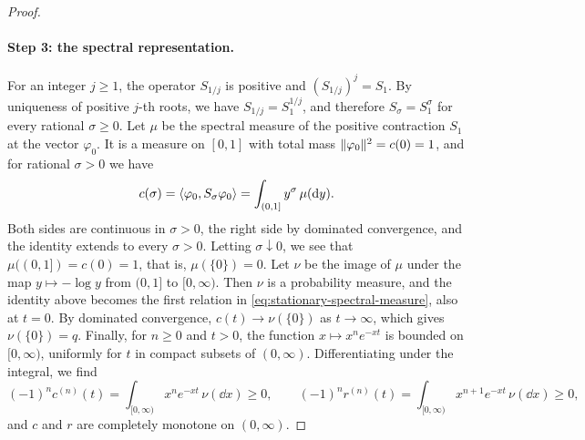 \begin{proof}
\paragraph{Step 3: the spectral representation.}
For an integer $j\ge1$, the operator $S_{1/j}$ is positive and $(S_{1/j})^j=S_1$. By uniqueness of positive $j$-th roots, we have $S_{1/j}=S_1^{1/j}$, and therefore $S_\sigma=S_1^\sigma$ for every rational $\sigma\ge0$. Let $\mu$ be the spectral measure of the positive contraction $S_1$ at the vector $\varphi_0$. It is a measure on $[0,1]$ with total mass $\lVert\varphi_0\rVert^2=c(0)=1$, and for rational $\sigma>0$ we have
\[
 c(\sigma)=\left\langle\varphi_0,S_\sigma\varphi_0\right\rangle=\int_{(0,1]}y^\sigma\,\mu(\mathop{}\!\mathrm d y).
\]
Both sides are continuous in $\sigma>0$, the right side by dominated convergence, and the identity extends to every $\sigma>0$. Letting $\sigma\downarrow0$, we see that $\mu((0,1])=c(0)=1$, that is, $\mu(\{0\})=0$. Let $\nu$ be the image of $\mu$ under the map $y\mapsto-\log y$ from $(0,1]$ to $[0,\infty)$. Then $\nu$ is a probability measure, and the identity above becomes the first relation in \eqref{eq:stationary-spectral-measure}, also at $t=0$. By dominated convergence, $c(t)\to\nu(\{0\})$ as $t\to\infty$, which gives $\nu(\{0\})=q$. Finally, for $n\ge0$ and $t>0$, the function $x\mapsto x^ne^{-xt}$ is bounded on $[0,\infty)$, uniformly for $t$ in compact subsets of $(0,\infty)$. Differentiating under the integral, we find
\[
 (-1)^nc^{(n)}(t)=\int_{[0,\infty)}x^ne^{-xt}\,\nu(\dd x)\ge0,\qquad
 (-1)^nr^{(n)}(t)=\int_{[0,\infty)}x^{n+1}e^{-xt}\,\nu(\dd x)\ge0,
\]
and $c$ and $r$ are completely monotone on $(0,\infty)$.
\end{proof}
